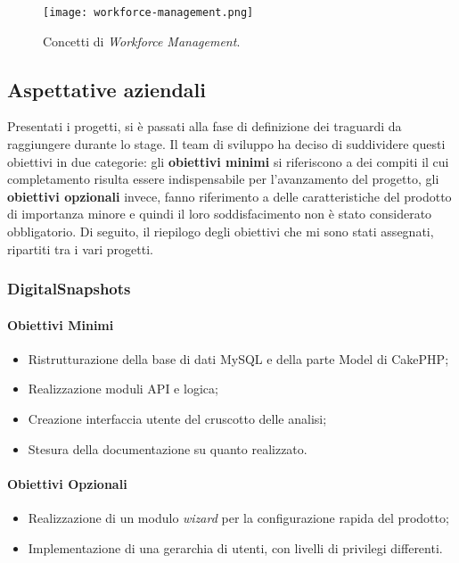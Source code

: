 \begin{figure}[h]
\texttt{[image: workforce-management.png]}
\centering
\caption{Concetti di \textit{Workforce Management}.} 
\label{fig:workforce-management}
\end{figure}


\subsection{Aspettative aziendali}

Presentati i progetti, si è passati alla fase di definizione dei traguardi da raggiungere durante lo stage.
Il team di sviluppo ha deciso di suddividere questi obiettivi in due categorie: gli \textbf{obiettivi minimi} si riferiscono a dei compiti il cui completamento risulta essere indispensabile per l'avanzamento del progetto, gli \textbf{obiettivi opzionali} invece, fanno riferimento a delle caratteristiche del prodotto di importanza minore e quindi il loro soddisfacimento non è stato considerato obbligatorio.
Di seguito, il riepilogo degli obiettivi che mi sono stati assegnati, ripartiti tra i vari progetti.

\subsubsection*{DigitalSnapshots}
\paragraph*{Obiettivi Minimi}
\begin{itemize}
\item Ristrutturazione della base di dati MySQL e della parte Model di CakePHP;
\item Realizzazione moduli API e logica;
\item Creazione interfaccia utente del cruscotto delle analisi; 
\item Stesura della documentazione su quanto realizzato.
\end{itemize}

\paragraph*{Obiettivi Opzionali}
\begin{itemize}
\item Realizzazione di un modulo \textit{wizard} per la configurazione rapida del prodotto;
\item Implementazione di una gerarchia di utenti, con livelli di privilegi differenti.
\end{itemize}

